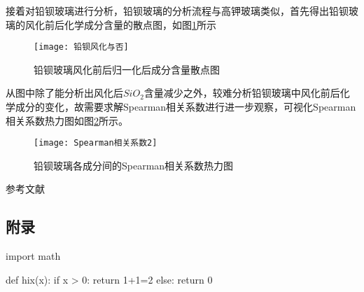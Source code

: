 \documentclass[withoutpreface,bwprint]{cumcmthesis} %
\begin{document}
接着对铅钡玻璃进行分析，铅钡玻璃的分析流程与高钾玻璃类似，首先得出铅钡玻璃的风化前后化学成分含量的散点图，如图\ref{qbfh}所示


\begin{figure}[!h]
	\centering
	\texttt{[image: 铅钡风化与否]}
	\caption{铅钡玻璃风化前后归一化后成分含量散点图}
	\label{qbfh}
\end{figure}


从图中除了能分析出风化后$SiO_{2}$含量减少之外，较难分析铅钡玻璃中风化前后化学成分的变化，故需要求解Spearman相关系数进行进一步观察，可视化Spearman相关系数热力图如图\ref{Spearman2}所示。


\begin{figure}[!h]
	\centering
	\texttt{[image: Spearman相关系数2]}
	\caption{铅钡玻璃各成分间的Spearman相关系数热力图}
	\label{Spearman2}
\end{figure}


\newpage
\begin{thebibliography}{9}%
	 参考文献
\end{thebibliography}



\newpage
\begin{appendices}
	

	\section{附录}

\begin{python}
import math

def hix(x):
if x > 0:
return 1+1=2
else:
return 0

\end{python}




\end{appendices}
\end{document}
